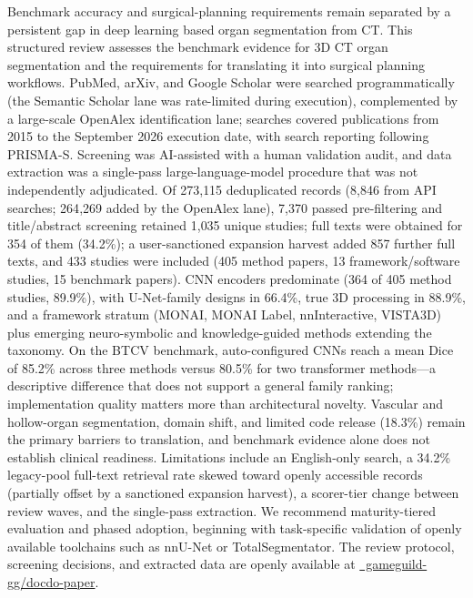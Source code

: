 Benchmark accuracy and surgical-planning requirements remain separated by a persistent gap in deep learning based organ segmentation from CT. This structured review assesses the benchmark evidence for 3D CT organ segmentation and the requirements for translating it into surgical planning workflows. PubMed, arXiv, and Google Scholar were searched programmatically (the Semantic Scholar lane was rate-limited during execution), complemented by a large-scale OpenAlex identification lane; searches covered publications from 2015 to the September 2026 execution date, with search reporting following PRISMA-S. Screening was AI-assisted with a human validation audit, and data extraction was a single-pass large-language-model procedure that was not independently adjudicated. Of 273{,}115 deduplicated records (8{,}846 from API searches; 264{,}269 added by the OpenAlex lane), 7{,}370 passed pre-filtering and title/abstract screening retained 1{,}035 unique studies; full texts were obtained for 354 of them (34.2\%); a user-sanctioned expansion harvest added 857 further full texts, and 433 studies were included (405 method papers, 13 framework/software studies, 15 benchmark papers). CNN encoders predominate (364 of 405 method studies, 89.9\%), with U-Net-family designs in 66.4\%, true 3D processing in 88.9\%, and a framework stratum (MONAI, MONAI Label, nnInteractive, VISTA3D) plus emerging neuro-symbolic and knowledge-guided methods extending the taxonomy. On the BTCV benchmark, auto-configured CNNs reach a mean Dice of 85.2\% across three methods versus 80.5\% for two transformer methods---a descriptive difference that does not support a general family ranking; implementation quality matters more than architectural novelty. Vascular and hollow-organ segmentation, domain shift, and limited code release (18.3\%) remain the primary barriers to translation, and benchmark evidence alone does not establish clinical readiness. Limitations include an English-only search, a 34.2\% legacy-pool full-text retrieval rate skewed toward openly accessible records (partially offset by a sanctioned expansion harvest), a scorer-tier change between review waves, and the single-pass extraction. We recommend maturity-tiered evaluation and phased adoption, beginning with task-specific validation of openly available toolchains such as nnU-Net or TotalSegmentator. The review protocol, screening decisions, and extracted data are openly available at \href{https://github.com/gameguild-gg/docdo-paper}{\faGithub\ gameguild-gg/docdo-paper}.
